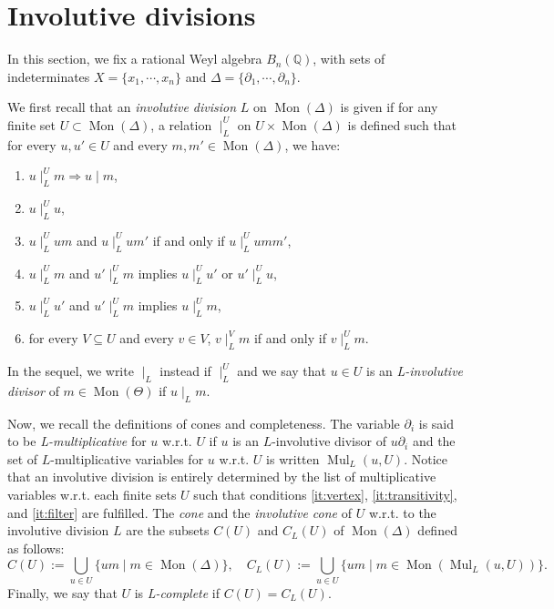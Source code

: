 \documentclass[10pt]{easychair}
\theoremstyle{definition}
\newcommand\Q{\mathbb{Q}}
\newcommand\Weyl[1]{B_{#1}(\Q)}
\DeclareMathOperator{\Mon}{Mon}
\DeclareMathOperator{\Mul}{Mul}
\newcommand\divInv[1]{\mid_{#1}}
\begin{document}
\section{Involutive divisions}

In this section, we fix a rational Weyl algebra $\Weyl{n}$, with sets of
indeterminates $X=\{x_1,\cdots,x_n\}$ and
$\Delta=\{\partial_1,\cdots,\partial_n\}$. 
\medskip

We first recall that an {\em involutive division} $L$ on $\Mon(\Delta)$
is given if for any finite set $U\subset\Mon(\Delta)$, a relation
$\divInv{L}^U$ on $U\times\Mon(\Delta)$ is defined such that for every
$u,u'\in U$ and every $m,m'\in\Mon(\Delta)$, we have:
\begin{enumerate}[label=\alph*)]
\item $u\divInv{L}^Um\Rightarrow u\mid m$,
\item $u\divInv{L}^Uu$,
\item $u\divInv{L}^Uum$ and $u\divInv{L}^Uum'$ if and only if
  $u\divInv{L}^Uumm'$,
\item\label{it:vertex} $u\divInv{L}^Um$ and $u'\divInv{L}^Um$ implies
  $u\divInv{L}^Uu'$ or $u'\divInv{L}^Uu$,
\item\label{it:transitivity} $u\divInv{L}^Uu'$ and $u'\divInv{L}^Um$
  implies $u\divInv{L}^Um$,
\item\label{it:filter} for every $V\subseteq U$ and every $v\in V$,
  $v\divInv{L}^Vm$ if and only if $v\divInv{L}^Um$. 
\end{enumerate}
In the sequel, we write $\divInv{L}$ instead if $\divInv{L}^U$ and we say
that $u\in U$ is an {\em L-involutive divisor} of $m\in\Mon(\Theta)$ if
$u\divInv{L}m$.
\medskip

Now, we recall the definitions of cones and completeness. The variable
$\partial_i$ is said to be {\em L-multiplicative} for $u$ w.r.t. $U$ if
$u$ is an $L$-involutive divisor of $u\partial_i$ and the set of
$L$-multiplicative variables for $u$ w.r.t. $U$ is written $\Mul_L(u,U)$.
Notice that an involutive division is entirely determined by the list of
multiplicative variables w.r.t. each finite sets $U$ such that conditions
\ref{it:vertex}, \ref{it:transitivity}, and \ref{it:filter} are
fulfilled. The {\em cone} and the {\em involutive cone} of $U$ w.r.t. to
the involutive division $L$ are the subsets $C(U)$ and $C_L(U)$ of
$\Mon(\Delta)$ defined as follows:
\[C(U):=\bigcup_{u\in U}\{um\mid m\in\Mon(\Delta)\},\quad
C_L(U):=\bigcup_{u\in U}\{um\mid m\in\Mon(\Mul_L(u,U))\}.\]
Finally, we say that $U$ is {\em L-complete} if $C(U)=C_L(U)$.
\smallskip
\end{document}
